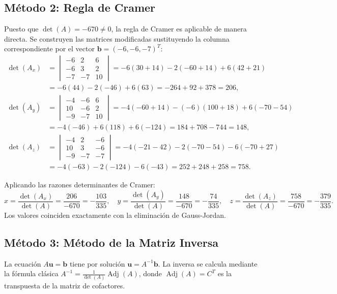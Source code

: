 \documentclass[spanish,letterpaper,oneside]{article}
\begin{document}
\subsection{Método 2: Regla de Cramer}
Puesto que $\det(A) = -670 \neq 0$, la regla de Cramer es aplicable de manera directa. Se construyen las matrices modificadas sustituyendo la columna correspondiente por el vector $\mathbf{b} = (-6, -6, -7)^T$:
\begin{align*}
\det(A_x) &= \begin{vmatrix} -6 & 2 & 6 \\ -6 & 3 & 2 \\ -7 & -7 & 10 \end{vmatrix} = -6(30+14) - 2(-60+14) + 6(42+21) \\
&= -6(44) - 2(-46) + 6(63) = -264 + 92 + 378 = 206, \\[0.2cm]
\det(A_y) &= \begin{vmatrix} -4 & -6 & 6 \\ 10 & -6 & 2 \\ -9 & -7 & 10 \end{vmatrix} = -4(-60+14) - (-6)(100+18) + 6(-70-54) \\
&= -4(-46) + 6(118) + 6(-124) = 184 + 708 - 744 = 148, \\[0.2cm]
\det(A_z) &= \begin{vmatrix} -4 & 2 & -6 \\ 10 & 3 & -6 \\ -9 & -7 & -7 \end{vmatrix} = -4(-21-42) - 2(-70-54) - 6(-70+27) \\
&= -4(-63) - 2(-124) - 6(-43) = 252 + 248 + 258 = 758.
\end{align*}

Aplicando las razones determinantes de Cramer:
\begin{equation}
x = \frac{\det(A_x)}{\det(A)} = \frac{206}{-670} = -\frac{103}{335}, \quad
y = \frac{\det(A_y)}{\det(A)} = \frac{148}{-670} = -\frac{74}{335}, \quad
z = \frac{\det(A_z)}{\det(A)} = \frac{758}{-670} = -\frac{379}{335}.
\end{equation}
Los valores coinciden exactamente con la eliminación de Gauss-Jordan.

\subsection{Método 3: Método de la Matriz Inversa}
La ecuación $A\mathbf{u} = \mathbf{b}$ tiene por solución $\mathbf{u} = A^{-1}\mathbf{b}$. La inversa se calcula mediante la fórmula clásica $A^{-1} = \frac{1}{\det(A)} \operatorname{Adj}(A)$, donde $\operatorname{Adj}(A) = C^T$ es la transpuesta de la matriz de cofactores.
\end{document}

